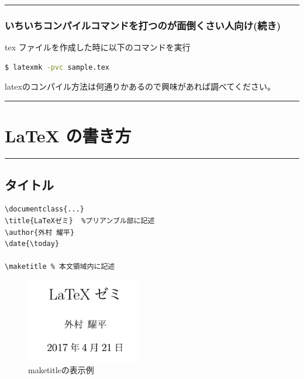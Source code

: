\begin{center}\rule{0.5\linewidth}{\linethickness}\end{center}

\subsubsection{いちいちコンパイルコマンドを打つのが面倒くさい人向け(続き)}\label{ux3044ux3061ux3044ux3061ux30b3ux30f3ux30d1ux30a4ux30ebux30b3ux30deux30f3ux30c9ux3092ux6253ux3064ux306eux304cux9762ux5012ux304fux3055ux3044ux4ebaux5411ux3051ux7d9aux304d}

tex ファイルを作成した時に以下のコマンドを実行

\begin{lstlisting}[language=bash]
$ latexmk -pvc sample.tex
\end{lstlisting}

latexのコンパイル方法は何通りかあるので興味があれば調べてください。

\begin{center}\rule{0.5\linewidth}{\linethickness}\end{center}

\hypertarget{latex-ux306eux66f8ux304dux65b9}{\section{LaTeX
の書き方}\label{latex-ux306eux66f8ux304dux65b9}}

\begin{center}\rule{0.5\linewidth}{\linethickness}\end{center}

\hypertarget{ux30bfux30a4ux30c8ux30eb}{\subsection{タイトル}\label{ux30bfux30a4ux30c8ux30eb}}

\begin{lstlisting}
\documentclass{...} 
\title{LaTeXゼミ}  %プリアンブル部に記述
\author{外村 耀平} 
\date{\today}  

\maketitle % 本文領域内に記述
\end{lstlisting}

\begin{figure}[htbp]
\centering
\includegraphics[width=5.00000cm]{./figures/title.png}
\caption{maketitleの表示例}
\end{figure}

